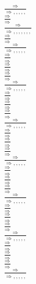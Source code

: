 \documentclass[11pt]{article}
\begin{document}
\begin{center}
\bigskip
\\$\frac{\Rightarrow }{\Rightarrow , , , , , }$
\bigskip
\\$\frac{\Rightarrow }{\Rightarrow }$
\bigskip
\\$\frac{\Rightarrow }{\Rightarrow , , , , , , , }$
\bigskip
\\$\frac{\Rightarrow }{\Rightarrow }$
\bigskip
\\$\frac{\Rightarrow }{\Rightarrow , , , , , }$
\bigskip
\\$\frac{\Rightarrow }{\Rightarrow }$
\bigskip
\\$\frac{\Rightarrow }{\Rightarrow }$
\bigskip
\\$\frac{\Rightarrow }{\Rightarrow }$
\bigskip
\\$\frac{\Rightarrow }{\Rightarrow , , , , , }$
\bigskip
\\$\frac{\Rightarrow }{\Rightarrow }$
\bigskip
\\$\frac{\Rightarrow }{\Rightarrow }$
\bigskip
\\$\frac{\Rightarrow }{\Rightarrow }$
\bigskip
\\$\frac{\Rightarrow }{\Rightarrow , , , , , }$
\bigskip
\\$\frac{\Rightarrow }{\Rightarrow }$
\bigskip
\\$\frac{\Rightarrow }{\Rightarrow }$
\bigskip
\\$\frac{\Rightarrow }{\Rightarrow }$
\bigskip
\\$\frac{\Rightarrow }{\Rightarrow , , , , , }$
\bigskip
\\$\frac{\Rightarrow }{\Rightarrow }$
\bigskip
\\$\frac{\Rightarrow }{\Rightarrow }$
\bigskip
\\$\frac{\Rightarrow }{\Rightarrow }$
\bigskip
\\$\frac{\Rightarrow }{\Rightarrow , , , , , }$
\bigskip
\\$\frac{\Rightarrow }{\Rightarrow }$
\bigskip
\\$\frac{\Rightarrow }{\Rightarrow }$
\bigskip
\\$\frac{\Rightarrow }{\Rightarrow }$
\bigskip
\\$\frac{\Rightarrow }{\Rightarrow , , , , , }$
\bigskip
\\$\frac{\Rightarrow }{\Rightarrow }$
\bigskip
\\$\frac{\Rightarrow }{\Rightarrow }$
\bigskip
\\$\frac{\Rightarrow }{\Rightarrow }$
\bigskip
\\$\frac{\Rightarrow }{\Rightarrow , , , , , }$

\end{center}
\end{document}
